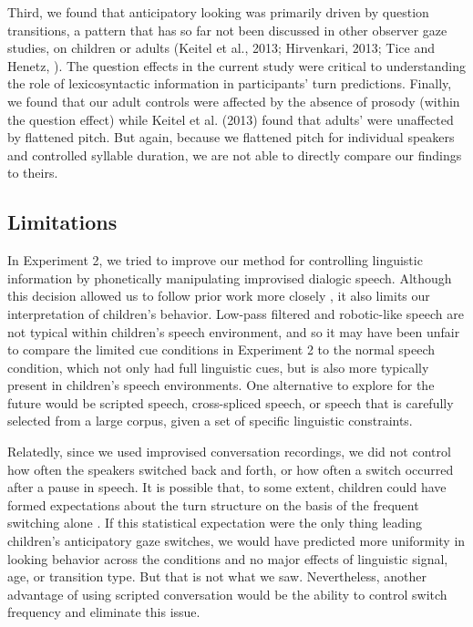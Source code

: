 \documentclass[authoryear, 12pt]{elsarticle}
\begin{document}
Third, we found that anticipatory looking was primarily driven by question transitions, a pattern that has so far not been discussed in other observer gaze studies, on children or adults (Keitel et al., 2013; Hirvenkari, 2013; Tice and Henetz, \citeyear{TiceHenetz11}). The question effects in the current study were critical to understanding the role of lexicosyntactic information in participants' turn predictions. Finally, we found that our adult controls were affected by the absence of prosody (within the question effect) while Keitel et al. (2013) found that adults' were unaffected by flattened pitch. But again, because we flattened pitch for individual speakers and controlled syllable duration, we are not able to directly compare our findings to theirs.

\subsection{Limitations}

In Experiment 2, we tried to improve our method for controlling linguistic information by phonetically manipulating improvised dialogic speech. Although this decision allowed us to follow prior work more closely \citep{de-ruiter2006, keitel2013}, it also limits our interpretation of children's behavior. Low-pass filtered and robotic-like speech are not typical within children's speech environment, and so it may have been unfair to compare the limited cue conditions in Experiment 2 to the normal speech condition, which not only had full linguistic cues, but is also more typically present in children's speech environments. One alternative to explore for the future would be scripted speech, cross-spliced speech, or speech that is carefully selected from a large corpus, given a set of specific linguistic constraints.

Relatedly, since we used improvised conversation recordings, we did not control how often the speakers switched back and forth, or how often a switch occurred after a pause in speech. It is possible that, to some extent, children could have formed expectations about the turn structure on the basis of the frequent switching alone \citep[see, e.g., ][]{thorgrimssonUndRev}. If this statistical expectation were the only thing leading children's anticipatory gaze switches, we would have predicted more uniformity in looking behavior across the conditions and no major effects of linguistic signal, age, or transition type. But that is not what we saw. Nevertheless, another advantage of using scripted conversation would be the ability to control switch frequency and eliminate this issue. 
\end{document}
